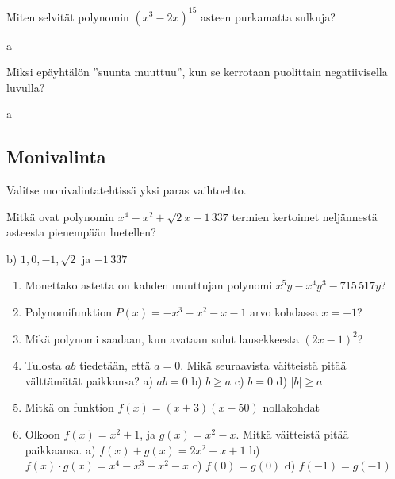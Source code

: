 \begin{tehtava}
Miten selvität polynomin $(x^3-2x)^{15}$ asteen purkamatta sulkuja?
	\begin{tehtava}
a
	\end{tehtava}
\end{tehtava}

\begin{tehtava}
Miksi epäyhtälön ''suunta muuttuu'', kun se kerrotaan puolittain negatiivisella luvulla?
	\begin{tehtava}
a
	\end{tehtava}
\end{tehtava}


\subsection{Monivalinta}

Valitse monivalintatehtissä yksi paras vaihtoehto.

\begin{tehtava}
Mitkä ovat polynomin $x^4-x^2+\sqrt{2}x-1\,337$ termien kertoimet neljännestä asteesta pienempään luetellen?
	\begin{alakohdat}
	\end{alakohdat}
	\begin{vastaus}
	b) $1, 0, -1, \sqrt{2}$ ja $-1\,337$
	\end{vastaus}
\end{tehtava}

\begin{enumerate}



\item Monettako astetta on kahden muuttujan polynomi $x^5y-x^4y^3-715\,517y$?
\item Polynomifunktion $P(x)=-x^3-x^2-x-1$ arvo kohdassa $x=-1$?
\item Mikä polynomi saadaan, kun avataan sulut lausekkeesta $(2x-1)^2$?
\item Tulosta $ab$ tiedetään, että $a = 0$. Mikä seuraavista väitteistä pitää välttämätät paikkansa?
a) $ab = 0$
b) $b \geq a$
c) $b = 0$
d) $|b| \geq a$

\item Mitkä on funktion $f(x) = (x+3)(x-50)$ nollakohdat
\item Olkoon $f(x) = x^2 + 1$, ja $g(x) = x^2 - x$. Mitkä väitteistä pitää paikkaansa.
a) $f(x) + g(x) = 2x^2 - x + 1$
b) $f(x) \cdot g(x) = x^4-x^3+x^2-x$
c) $f(0) = g(0)$
d) $f(-1) = g(-1)$
\end{enumerate}

